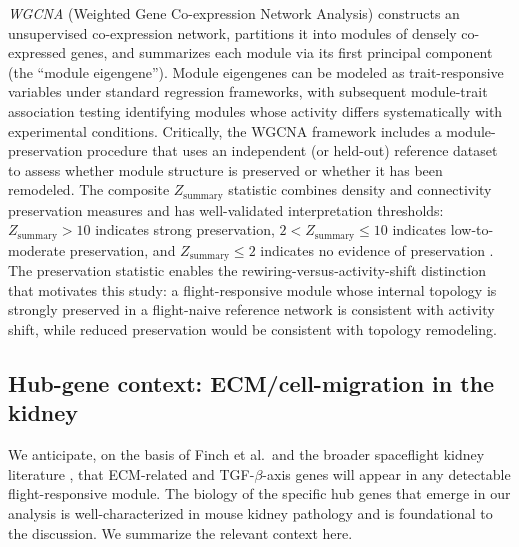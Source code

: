 \documentclass[11pt]{article}
\begin{document}
\emph{WGCNA} (Weighted Gene Co-expression Network Analysis) \citep{langfelder2008wgcna} constructs an unsupervised co-expression network, partitions it into modules of densely co-expressed genes, and summarizes each module via its first principal component (the ``module eigengene''). Module eigengenes can be modeled as trait-responsive variables under standard regression frameworks, with subsequent module-trait association testing identifying modules whose activity differs systematically with experimental conditions. Critically, the WGCNA framework includes a module-preservation procedure \citep{langfelder2011module} that uses an independent (or held-out) reference dataset to assess whether module structure is preserved or whether it has been remodeled. The composite $Z_{\text{summary}}$ statistic combines density and connectivity preservation measures and has well-validated interpretation thresholds: $Z_{\text{summary}} > 10$ indicates strong preservation, $2 < Z_{\text{summary}} \leq 10$ indicates low-to-moderate preservation, and $Z_{\text{summary}} \leq 2$ indicates no evidence of preservation \citep{langfelder2011module}. The preservation statistic enables the rewiring-versus-activity-shift distinction that motivates this study: a flight-responsive module whose internal topology is strongly preserved in a flight-naive reference network is consistent with activity shift, while reduced preservation would be consistent with topology remodeling.

\subsection{Hub-gene context: ECM/cell-migration in the kidney}

We anticipate, on the basis of Finch et al.\ and the broader spaceflight kidney literature \citep{finch2025strain, siew2024cosmic}, that ECM-related and TGF-$\beta$-axis genes will appear in any detectable flight-responsive module. The biology of the specific hub genes that emerge in our analysis is well-characterized in mouse kidney pathology and is foundational to the discussion. We summarize the relevant context here.
\end{document}
